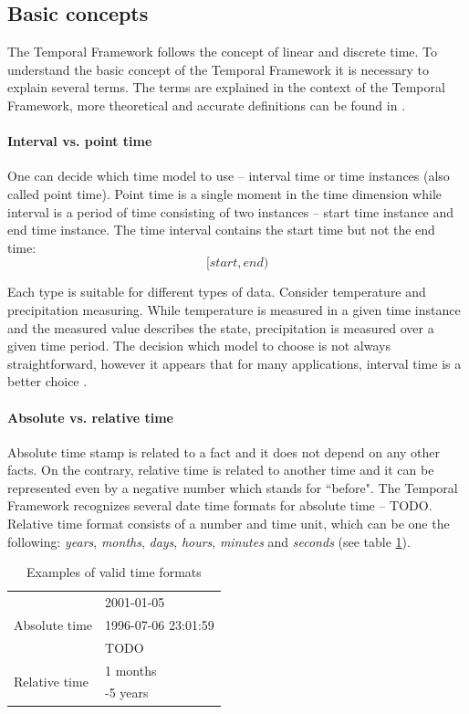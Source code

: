 \documentclass[a4paper,12pt]{book}
\newcommand{\tf}{Temporal Framework\xspace}
\begin{document}
\subsection{Basic concepts}
The \tf follows the concept of linear and discrete time.
To understand the basic concept of the \tf it is necessary to explain several terms.
The terms are explained in the context of the \tf , more theoretical and accurate definitions can be found in \cite{temporalGlossary}.

\paragraph{Interval vs. point time}
\label{sec:intervalVsPoint}
One can decide which time model to use -- interval time or time instances (also called point time).
Point time is a single moment in the time dimension
while interval is a period of time consisting of two instances -- start time instance and end time instance.
The time interval contains the start time but not the end time:
$$[start, end)$$

Each type is suitable for different types of data.
Consider temperature and precipitation measuring.
While temperature is measured in a given time instance and the measured value describes the state,
precipitation is measured over a given time period. The decision which model to choose is not always
straightforward, however it appears that for many applications,
interval time is a better choice \cite{pointVsInterval}.

\paragraph{Absolute vs. relative time}
\label{sec:absoluteVsRelative}
Absolute time stamp is related to a fact and it does not depend on any other facts.
On the contrary, relative time is related to another time and
it can be represented even by a negative number which stands for ``before".
The \tf recognizes several date time formats for absolute time -- TODO.
Relative time format consists of a number and time unit, which can be one the following: \emph{years},
\emph{months}, \emph{days}, \emph{hours}, \emph{minutes} and \emph{seconds} (see table \ref{tab:timeFormat}).

\begin{table}[ht!]
  \centering
\caption{Examples of valid time formats}
\label{tab:timeFormat}
\setlength{\extrarowheight}{3pt}
\begin{tabular}{|l|l|}
\hline
\multirow{3}{*}{Absolute time}
 & 2001-01-05  \\ \cline{2-2}
 & 1996-07-06 23:01:59  \\\cline{2-2}
 & TODO  \\
 \hline
\multirow{2}{*}{Relative time}
 & 1 months  \\\cline{2-2}
 & -5 years  \\
 \hline
\end{tabular}
\end{table}
\end{document}
